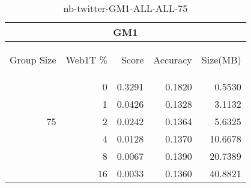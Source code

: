 \begin{center}
\begin{table}[htbp]
\begin{tabular}{ | r | r | r | r | r |}
\hline
\multicolumn{5}{|c|}{GM1}\\
\hline
\begin{sideways}Group Size\end{sideways} & \begin{sideways}Web1T \%\end{sideways} & \begin{sideways}Score\end{sideways} & \begin{sideways}Accuracy\end{sideways} & \begin{sideways}Size(MB)\end{sideways}\\
\hline
\multirow{5}{*}{75}
 & 0 & 0.3291 & 0.1820 & 0.5530\\ \cline{2-5}
 & 1 & 0.0426 & 0.1328 & 3.1132\\ \cline{2-5}
 & 2 & 0.0242 & 0.1364 & 5.6325\\ \cline{2-5}
 & 4 & 0.0128 & 0.1370 & 10.6678\\ \cline{2-5}
 & 8 & 0.0067 & 0.1390 & 20.7389\\ \cline{2-5}
 & 16 & 0.0033 & 0.1360 & 40.8821\\ \cline{2-5}
\hline
\end{tabular}
\caption{nb-twitter-GM1-ALL-ALL-75}
\label{table:nb-twitter-GM1-ALL-ALL-75}
\end{table}
\end{center}


